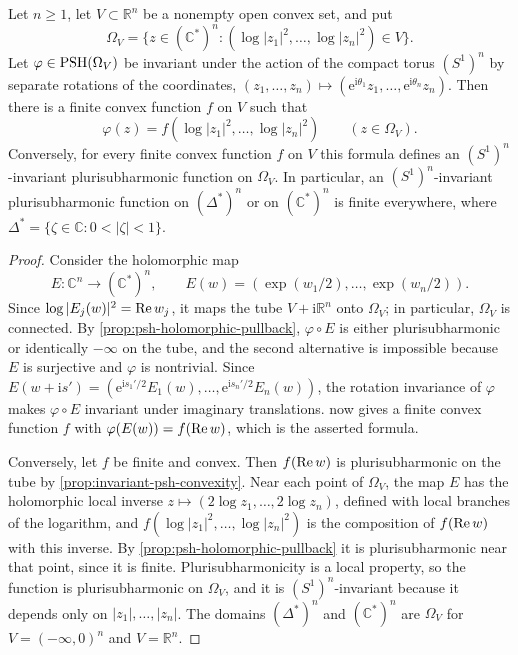 \begin{corollary}\label{cor:toric-psh-finiteness}
Let $n\geq1$, let $V\subset\mathbb R^n$ be a nonempty open convex set, and put
\[
 \Omega_V=\{z\in(\mathbb C^*)^n:
                   (\log|z_1|^2,\ldots,\log|z_n|^2)\in V\}.
\]
Let $\varphi\in\mathrm{PSH}(\Omega_V)$ be invariant under the action of the compact torus $(S^1)^n$ by separate rotations of the coordinates, $(z_1,\ldots,z_n)\mapsto(\mathrm e^{\mathrm i\theta_1}z_1,\ldots,\mathrm e^{\mathrm i\theta_n}z_n)$. Then there is a finite convex function $f$ on $V$ such that
\[
 \varphi(z)=f(\log|z_1|^2,\ldots,\log|z_n|^2)\qquad(z\in\Omega_V).
\]
Conversely, for every finite convex function $f$ on $V$ this formula defines an $(S^1)^n$-invariant plurisubharmonic function on $\Omega_V$. In particular, an $(S^1)^n$-invariant plurisubharmonic function on $(\Delta^*)^n$ or on $(\mathbb C^*)^n$ is finite everywhere, where $\Delta^*=\{\zeta\in\mathbb C:0<|\zeta|<1\}$.
\end{corollary}
\begin{proof}
Consider the holomorphic map
\[
 E\colon\mathbb C^n\to(\mathbb C^*)^n,\qquad E(w)=(\exp(w_1/2),\ldots,\exp(w_n/2)).
\]
Since $\log|E_j(w)|^2=\operatorname{Re} w_j$, it maps the tube $V+\mathrm i\mathbb R^n$ onto $\Omega_V$; in particular, $\Omega_V$ is connected. By \cref{prop:psh-holomorphic-pullback}, $\varphi\circ E$ is either plurisubharmonic or identically $-\infty$ on the tube, and the second alternative is impossible because $E$ is surjective and $\varphi$ is nontrivial. Since $E(w+\mathrm is')=(\mathrm e^{\mathrm is_1'/2}E_1(w),\ldots,\mathrm e^{\mathrm is_n'/2}E_n(w))$, the rotation invariance of $\varphi$ makes $\varphi\circ E$ invariant under imaginary translations.  now gives a finite convex function $f$ with $\varphi(E(w))=f(\operatorname{Re} w)$, which is the asserted formula.

Conversely, let $f$ be finite and convex. Then $f(\operatorname{Re} w)$ is plurisubharmonic on the tube by \cref{prop:invariant-psh-convexity}. Near each point of $\Omega_V$, the map $E$ has the holomorphic local inverse $z\mapsto(2\log z_1,\ldots,2\log z_n)$, defined with local branches of the logarithm, and $f(\log|z_1|^2,\ldots,\log|z_n|^2)$ is the composition of $f(\operatorname{Re} w)$ with this inverse. By \cref{prop:psh-holomorphic-pullback} it is plurisubharmonic near that point, since it is finite. Plurisubharmonicity is a local property, so the function is plurisubharmonic on $\Omega_V$, and it is $(S^1)^n$-invariant because it depends only on $|z_1|,\ldots,|z_n|$. The domains $(\Delta^*)^n$ and $(\mathbb C^*)^n$ are $\Omega_V$ for $V=(-\infty,0)^n$ and $V=\mathbb R^n$.
\end{proof}
